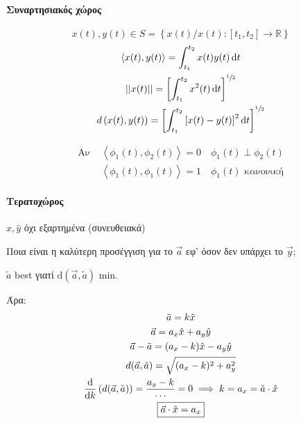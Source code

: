     \paragraph{Συναρτησιακός χώρος}
    \[
    x(t),y(t) \in S =
    \left\lbrace x(t)/x(t):[t_1,t_2]\to\mathbb R  \right\rbrace
    \]
    \begin{gather*}
    \left\langle
    x(t),y(t)
    \right\rangle  = \int_{t_1}^{t_2}x(t)y(t)\mathop{}\!\mathrm{d} t\\
    \left\vert\middle\vert x(t)\middle\vert\right\vert =
    \left[ \int_{t_1}^{t_2} x^2(t)\mathop{}\!\mathrm{d} t \right]^{\sfrac{1}{2}}\\
    d\left(
    x(t),y(t)
    \right)=\left[
    \int_{t_1}^{t_2} \left[ x(t)-y(t) \right]^2\mathop{}\!\mathrm{d} t
    \right]^{\sfrac{1}{2}}
    \end{gather*}

    \begin{align*}
    \text{Αν } & \left\langle \phi_1(t),\phi_2(t) \right\rangle
    = 0 \quad \phi_1(t) \perp \phi_2(t) \\
    & \left\langle \phi_1(t),\phi_1(t)\right\rangle = 1 \quad
    \phi_1(t) \text{ κανονική}
    \end{align*}

    \paragraph{Τερατοχώρος}


    \( \hat x,\hat y \) όχι εξαρτημένα (συνευθειακά)

    Ποια είναι η καλύτερη προσέγγιση για το \(\vec a\) εφ' όσον δεν υπάρχει
    το \( \vec y \);

    \( \tilde a \) best γιατί \(\mathrm d(\vec a,\tilde a)\) min.

    Άρα:
    \begin{gather*}
        \tilde a = k\hat x \\
        \vec a = a_x\hat x+a_y\hat y\\
        \vec a -\tilde a = (a_x-k)\hat x - a_y\hat y\\
        d(\vec a,\tilde a) = \sqrt{(a_x-k)^2+a_y^2} \\
        \od{}{k}\left( d(\vec a,\tilde a) \right) = \frac{a_x-k}{\cdots}
        = 0 \implies k=a_x = \tilde a \cdot \hat x\\
        \boxed{\vec a\cdot\hat x = a_x}
    \end{gather*}

